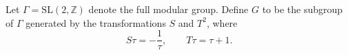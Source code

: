 Let $\Gamma = \text{SL}(2,\mathbb{Z})$ denote the full modular group. Define $G$ to be the subgroup of $\Gamma$ generated by the transformations $S$ and $T^2$, where
$$S\tau = -\frac{1}{\tau}, \qquad T\tau = \tau + 1.$$
